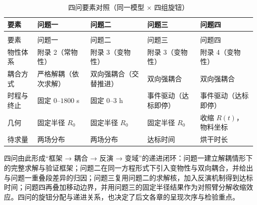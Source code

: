 \begin{longtable}{>{\centering\arraybackslash}m{\dimexpr 0.180\tblw\relax}>{\centering\arraybackslash}m{\dimexpr 0.198\tblw\relax}>{\centering\arraybackslash}m{\dimexpr 0.202\tblw\relax}>{\centering\arraybackslash}m{\dimexpr 0.198\tblw\relax}>{\centering\arraybackslash}m{\dimexpr 0.220\tblw\relax}}
  \caption{四问要素对照（同一模型 × 四组旋钮）}\label{tab:2-1}\\
  \toprule
    要素 & 问题一 & 问题二 & 问题三 & 问题四 \\
  \midrule
  \endfirsthead
  \multicolumn{5}{r}{\footnotesize（续）}\\
  \toprule
    要素 & 问题一 & 问题二 & 问题三 & 问题四 \\
  \midrule
  \endhead
  \bottomrule
  \endfoot
  \bottomrule
  \endlastfoot
  物性体系 & 附录 2（常物性） & 附录 3（变物性） & 附录 3（变物性） & 附录 4（变物性） \\
  耦合方式 & 严格解耦（依次求解） & 双向强耦合（交替推进） & 双向强耦合 & 双向强耦合 \\
  时程与终止 & 固定 $0$–$1800$ s & 固定 $0$–$3$ h & 事件驱动（达标即停） & 事件驱动（达标即停） \\
  几何 & 固定半径 $R_0$ & 固定半径 $R_0$ & 固定半径 $R_0$ & 收缩 $R(t)$，物料坐标 \\
  待求量 & 两场分布 & 两场分布 & 达标时间 & 烘干时长 \\
\end{longtable}

四问由此形成“框架 → 耦合 → 反演 → 变域”的递进闭环：问题一建立解耦情形下的完整求解与验证框架；问题二在同一方程形式下引入变物性与双向耦合，并给出与问题一重叠段差异的归因；问题三复用问题二的求解核，加入反演机制得到达标时间；问题四再叠加移动边界，并用问题三的固定半径结果作为对照臂分解收缩效应。四问的旋钮分配与递进关系，也决定了后文各章的呈现次序与检验重点。
